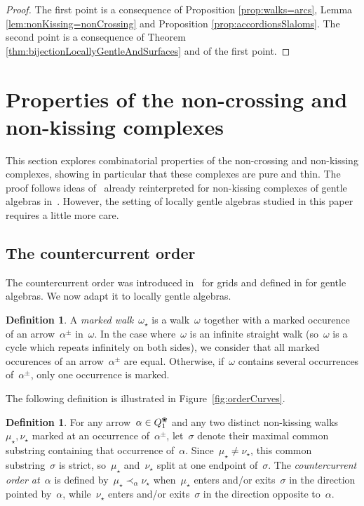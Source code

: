 \documentclass{amsart}
\theoremstyle{definition}
\newtheorem{definition}[theorem]{Definition}
\newcommand{\fref}[1]{Figure~\ref{#1}} %
\newcommand{\darkblue}{\color{darkblue}} %
\newcommand{\defn}[1]{\textsl{\darkblue #1}} %
\newcommand{\blossom}{^\text{\ding{96}}} %
\begin{document}
\begin{proof}
 The first point is a consequence of Proposition \ref{prop:walks=arcs}, Lemma \ref{lem:nonKissing=nonCrossing} and Proposition \ref{prop:accordionsSlaloms}.
 The second point is a consequence of Theorem \ref{thm:bijectionLocallyGentleAndSurfaces} and of the first point.
\end{proof}

\section{Properties of the non-crossing and non-kissing complexes}\label{sec:propertiesOfComplexes}

This section explores combinatorial properties of the non-crossing and non-kissing complexes, showing in particular that these complexes are pure and thin.
The proof follows ideas of~\cite{McConville, GarverMcConville} already reinterpreted for non-kissing complexes of gentle algebras in~\cite{PaluPilaudPlamondon}.
However, the setting of locally gentle algebras studied in this paper requires a little more care.

\subsection{The countercurrent order}

The countercurrent order was introduced in~\cite{McConville} for grids and defined in \cite{PaluPilaudPlamondon} for gentle algebras.
We now adapt it to locally gentle algebras.

\begin{definition}
A \defn{marked walk}~$\omega_\star$ is a walk~$\omega$ together with a marked occurence of an arrow~$\alpha^{\pm}$ in~$\omega$.
In the case where~$\omega$ is an infinite straight walk (so~$\omega$ is a cycle which repeats infinitely on both sides), we consider that all marked occurences of an arrow~$\alpha^\pm$ are equal.
Otherwise, if~$\omega$ contains several occurrences of~$\alpha^\pm$, only one occurrence is marked.
\end{definition}

The following definition is illustrated in \fref{fig:orderCurves}.

\begin{definition}
For any arrow~$\alpha \in Q\blossom_1$ and any two distinct non-kissing walks~$\mu_\star, \nu_\star$ marked at an occurrence of~$\alpha^\pm$,
let~$\sigma$ denote their maximal common substring containing that occurrence of~$\alpha$.
Since~$\mu_\star \ne \nu_\star$, this common substring~$\sigma$ is strict, so~$\mu_\star$ and~$\nu_\star$ split at one endpoint of~$\sigma$.
The \defn{countercurrent order at~$\alpha$} is defined by~$\mu_\star \prec_\alpha \nu_\star$ when~$\mu_\star$ enters and/or exits~$\sigma$ in the direction pointed by~$\alpha$, while~$\nu_\star$ enters and/or exits~$\sigma$ in the direction opposite to~$\alpha$.
\end{definition}
\end{document}
